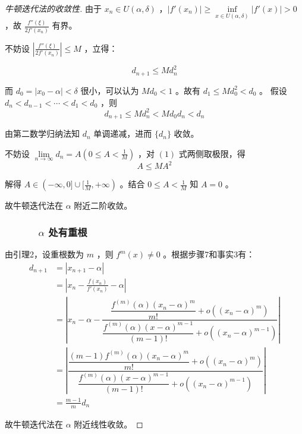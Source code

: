 \begin{proof}[牛顿迭代法的收敛性]
		由于 $x_n \in U(\alpha, \delta)$ ，$|f'(x_n)| \ge \inf\limits_{x \in U(\alpha, \delta)} |f'(x)| > 0$ ，故 $\frac{f''(\xi)}{2f'(x_n)}$ 有界。
		
		不妨设 $\left|\frac{f''(\xi)}{2f'(x_n)}\right| \le M$ ，立得：
		
		\begin{equation}
			d_{n + 1} \le Md_n^2
		\end{equation}
		
		而 $d_0 = |x_0 - \alpha| < \delta$ 很小，可以认为 $Md_0 < 1$ 。故有 $d_1 \le Md_0^2 < d_0$ 。
		假设 $d_n < d_{n - 1} < \cdots < d_1 < d_0$ ，则
		$$
		d_{n + 1} \le Md_n^2 < Md_0d_n < d_n
		$$
		
		由第二数学归纳法知 ${d_n}$ 单调递减，进而 $\{d_n\}$ 收敛。
		
		不妨设 $\lim\limits_{n \rightarrow \infty} d_n = A (0 \le A < \frac{1}{M})$ ，对 $(1)$ 式两侧取极限，得
		$$
		A \le MA^2
		$$
		
		解得 $A \in (-\infty, 0] \cup [\frac{1}{M}, +\infty)$ 。结合 $0 \le A < \frac{1}{M}$ 知 $A = 0$ 。
		
		故牛顿迭代法在 $\alpha$ 附近二阶收敛。
		
		\subsubsection*{\ \ \ \ \ \ $\alpha$ 处有重根}
		由引理2，设重根数为 $m$ ，则 $f^{m}(x) \neq 0$ 。根据步骤7和事实3有：
		$$
		\begin{aligned}
		d_{n + 1} & = \left|x_{n + 1} - \alpha \right| \\
		& = \left|x_n - \frac{f(x_n)}{f'(x_n)} - \alpha\right| \\
		& = \left|x_n - \alpha - \dfrac{\dfrac{f^{(m)}(\alpha)(x_n - \alpha)^m}{m!} + o((x_n - \alpha)^m)}{\dfrac{f^{(m)}(\alpha)(x - \alpha)^{m - 1}}{(m - 1)!} + o((x_n - \alpha)^{m - 1})} \right| \\
		& = \left|\dfrac{\dfrac{(m - 1)f^{(m)}(\alpha)(x_n - \alpha)^m}{m!} + o((x_n - \alpha)^m)}{\dfrac{f^{(m)}(\alpha)(x - \alpha)^{m - 1}}{(m - 1)!} + o((x_n - \alpha)^{m - 1})}\right| \\
		& = \frac{m - 1}{m}d_n
		\end{aligned}
		$$
		
		故牛顿迭代法在 $\alpha$ 附近线性收敛。
		\qedhere
		
		
	\end{proof}

